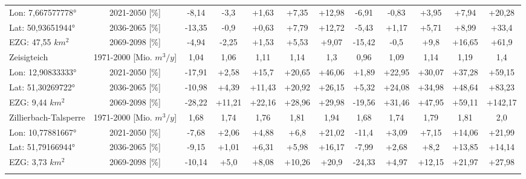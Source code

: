 \begin{longtable}{@{\extracolsep{\fill}}lc|ccccc||ccccc}
\cline{2-12} 
Lon: 7,667577778° & 2021-2050 [\%]  & -8,14 & -3,3 & +1,63 & +7,35 & +12,98 & -6,91 & -0,83 & +3,95 & +7,94 & +20,28\\ 
Lat: 50,93651944° & 2036-2065 [\%]  & -13,35 & -0,9 & +0,63 & +7,79 & +12,72 & -5,43 & +1,17 & +5,71 & +8,99 & +33,4\\ 
EZG: 47,55 $km^2$ & 2069-2098 [\%]  & -4,94 & -2,25 & +1,53 & +5,53 & +9,07 & -15,42 & -0,5 & +9,8 & +16,65 & +61,9\\ 
\hline 
Zeisigteich & 1971-2000 [Mio. $m^3/y$]  & 1,04 & 1,06 & 1,11 & 1,14 & 1,3 & 0,96 & 1,09 & 1,14 & 1,19 & 1,4\\ 
\cline{2-12} 
Lon: 12,90833333° & 2021-2050 [\%]  & -17,91 & +2,58 & +15,7 & +20,65 & +46,06 & +1,89 & +22,95 & +30,07 & +37,28 & +59,15\\ 
Lat: 51,30269722° & 2036-2065 [\%]  & -10,98 & +4,39 & +11,43 & +20,92 & +26,15 & +5,32 & +24,08 & +34,98 & +48,64 & +83,23\\ 
EZG: 9,44 $km^2$ & 2069-2098 [\%]  & -28,22 & +11,21 & +22,16 & +28,96 & +29,98 & -19,56 & +31,46 & +47,95 & +59,11 & +142,17\\ 
\hline 
Zillierbach-Talsperre & 1971-2000 [Mio. $m^3/y$]  & 1,68 & 1,74 & 1,76 & 1,81 & 1,94 & 1,68 & 1,74 & 1,79 & 1,81 & 2,0\\ 
\cline{2-12} 
Lon: 10,77881667° & 2021-2050 [\%]  & -7,68 & +2,06 & +4,88 & +6,8 & +21,02 & -11,4 & +3,09 & +7,15 & +14,06 & +21,99\\ 
Lat: 51,79166944° & 2036-2065 [\%]  & -9,15 & +1,01 & +6,31 & +5,98 & +16,17 & -7,99 & +2,68 & +8,2 & +13,85 & +14,14\\ 
EZG: 3,73 $km^2$ & 2069-2098 [\%]  & -10,14 & +5,0 & +8,08 & +10,26 & +20,9 & -24,33 & +4,97 & +12,15 & +21,97 & +27,98\\\hline
\label{Qrouted_sum_Talsperren_less50facc}
\end{longtable}
\addtolength{\tabcolsep}{5.9pt}
